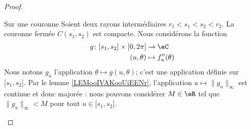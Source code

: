 \begin{proof}
\begin{subproof}
\begin{subproof}
			\item[Sur une couronne]
			Soient deux rayons intermédiaires \( r_1<s_1<s_2<r_2\). La couronne fermée \( \overline{ C(s_1,s_2) }\) est compacte. Nous considérons la fonction
			\begin{equation}
				\begin{aligned}
					g\colon \mathopen[ s_1 , s_2 \mathclose]\times \mathopen[ 0 , 2\pi \mathclose] & \to \eC               \\
					(u,\theta)                                                                     & \mapsto f''_u(\theta)
				\end{aligned}
			\end{equation}
			Nous notons \( g_u\) l'application \( \theta\mapsto g(u,\theta)\); c'est une application définie sur \( \mathopen[ s_1 , s_2 \mathclose]\). Par le lemme \ref{LEMooIVAKooUiEENr}, l'application \( u\mapsto \| g_u \|_{\infty}\) est continue et donc majorée : nous pouvons considérer \( M\in \eR\) tel que \( \| g_u \|_{\infty}<M\) pour tout \( u\in \mathopen[ s_1 , s_2 \mathclose]\).


\end{subproof}
\end{subproof}
\end{proof}
